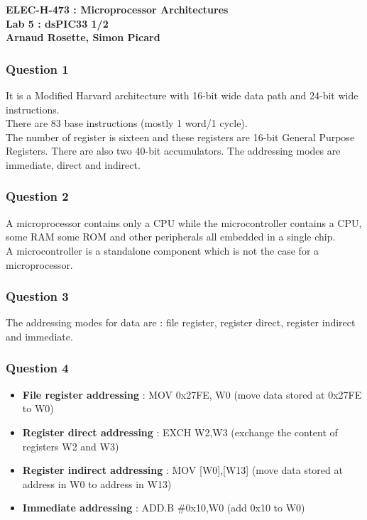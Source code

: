 \documentclass[a4paper,10pt]{article}
\begin{document}
\begin{center}
\textbf{ELEC-H-473 : Microprocessor Architectures\\ Lab 5 : dsPIC33 1/2\\Arnaud Rosette, Simon Picard}
\end{center}

\subsubsection*{Question 1}
It is a Modified Harvard architecture with 16-bit wide data path and 24-bit wide instructions.\\
There are 83 base instructions (mostly 1 word/1 cycle).\\
The number of register is sixteen and these registers are 16-bit General Purpose Registers. There are also two 40-bit accumulators. The addressing modes are immediate, direct and indirect.

\subsubsection*{Question 2}
A microprocessor contains only a CPU while the microcontroller contains a CPU, some RAM some ROM and other peripherals all embedded in a single chip.\\
A microcontroller is a standalone component which is not the case for a microprocessor.

\subsubsection*{Question 3}
The addressing modes for data are : file register, register direct, register indirect and immediate.

\subsubsection*{Question 4}
\begin{itemize}
\item \textbf{File register addressing} : MOV 0x27FE, W0 (move data stored at 0x27FE to W0)
\item \textbf{Register direct addressing} : EXCH W2,W3 (exchange the content of registers W2 and W3)
\item \textbf{Register indirect addressing} : MOV [W0],[W13] (move data stored at address in W0 to address in W13)
\item \textbf{Immediate addressing} : ADD.B $\#$0x10,W0 (add 0x10 to W0)
\end{itemize}
\end{document}

